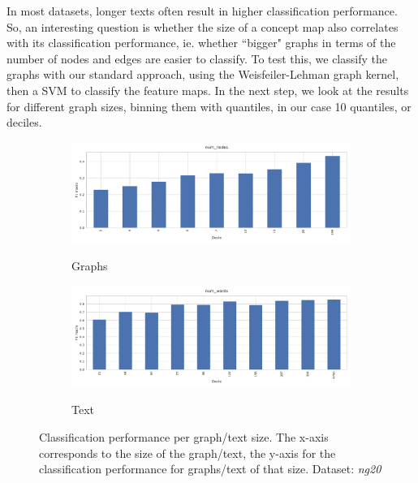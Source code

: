 
In most datasets, longer texts often result in higher classification performance.
So, an interesting question is whether the size of a concept map also correlates with its classification performance, ie. whether ``bigger" graphs in terms of the number of nodes and edges are easier to classify.
To test this, we classify the graphs with our standard approach, using the Weisfeiler-Lehman graph kernel, then a SVM to classify the feature maps.
In the next step, we look at the results for different graph sizes, binning them with quantiles, in our case 10 quantiles, or deciles.

\begin{figure}[htb!]
	\begin{subfigure}[t]{.5\linewidth}	{\includegraphics[width=\linewidth]{assets/figures/graph_binning_num_nodes.pdf}\label{fig:todo_1}}
	\caption{Graphs}
	\end{subfigure}
	\hfill
		\begin{subfigure}[t]{.5\linewidth}
	{\includegraphics[width=\linewidth]{assets/figures/text_binning_num_words.pdf}\label{fig:todo_2}}
	\caption{Text}
	\end{subfigure}
	\caption[Statistics: Histogram of classification performance per graph/text size]{Classification performance per graph/text size. The x-axis corresponds to the size of the graph/text, the y-axis for the classification performance for graphs/text of that size. Dataset: \textit{ng20}}\label{fig:graph_size_performance}
\end{figure}

